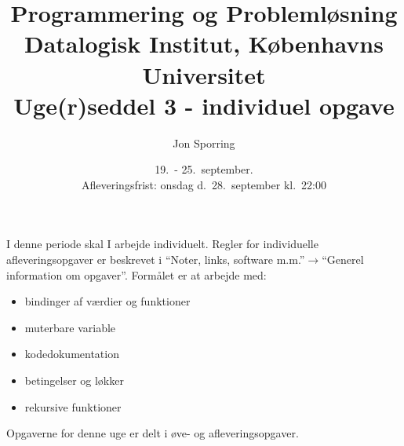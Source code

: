 \documentclass[a4paper,12pt]{article}
\title{Programmering og Problemløsning\\Datalogisk Institut,
  Københavns Universitet\\Uge(r)seddel 3 - individuel opgave}
\author{Jon Sporring}
\date{19.\ - 25.\ september.\\Afleveringsfrist: onsdag d.\ 28.\ september kl.\ 22:00}
\begin{document}
\maketitle

I denne periode skal I arbejde individuelt. Regler for individuelle afleveringsopgaver er beskrevet i "`Noter, links, software m.m."'$\rightarrow$"`Generel information om opgaver"'. Formålet er at arbejde med:
\begin{itemize}
\item bindinger af værdier og funktioner
\item muterbare variable
\item kodedokumentation
\item betingelser og løkker
\item rekursive funktioner
\end{itemize}

Opgaverne for denne uge er delt i øve- og afleveringsopgaver. 
\end{document}
